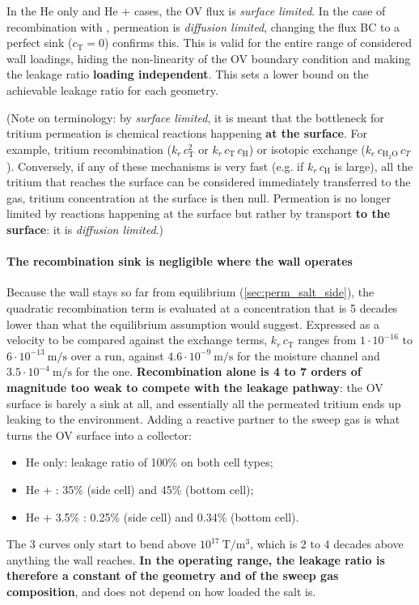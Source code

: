 \documentclass[a4paper,11pt,oneside]{report}
\newcounter{assumption}[chapter]
\begin{document}
In the He only and He +  cases, the OV flux is \textit{surface limited}. In the case of recombination with , permeation is \textit{diffusion limited}, changing the flux BC to a perfect sink ($c_\mathrm{T}=0$) confirms this. This is valid for the entire range of considered wall loadings, hiding the non-linearity of the OV boundary condition and making the leakage ratio \textbf{loading independent}. This sets a lower bound on the achievable leakage ratio for each geometry.

(Note on terminology: by \textit{surface limited}, it is meant that the bottleneck for tritium permeation is chemical reactions happening \textbf{at the surface}. For example, tritium recombination ($k_r\,c_\mathrm{T}^2$ or $k_r\,c_\mathrm{T}\,c_\mathrm{H}$) or isotopic exchange ($k_e\,c_\mathrm{H_2O}\,c_T$). Conversely, if any of these mechanisms is very fast (e.g. if $k_r\,c_\mathrm{H}$ is large), all the tritium that reaches the surface can be considered immediately transferred to the gas, tritium concentration at the surface is then null. Permeation is no longer limited by reactions happening at the surface but rather by transport \textbf{to the surface}: it is \textit{diffusion limited}.)

\paragraph{The recombination sink is negligible where the wall operates}
Because the wall stays so far from equilibrium (\cref{sec:perm_salt_side}), the quadratic recombination term is evaluated at a concentration that is 5 decades lower than what the equilibrium assumption would suggest. Expressed as a velocity to be compared against the exchange terms, $k_r\,c_\mathrm{T}$ ranges from $1\cdot10^{-16}$ to $6\cdot10^{-13}\ \mathrm{m/s}$ over a run, against $4.6\cdot10^{-9}\ \mathrm{m/s}$ for the moisture channel and $3.5\cdot10^{-4}\ \mathrm{m/s}$ for the  one. \textbf{Recombination alone is 4 to 7 orders of magnitude too weak to compete with the leakage pathway}: the OV surface is barely a sink at all, and essentially all the permeated tritium ends up leaking to the environment. Adding a reactive partner to the sweep gas is what turns the OV surface into a collector:
\begin{itemize}
    \item He only: leakage ratio of 100\% on both cell types;
    \item He + : 35\% (side cell) and 45\% (bottom cell);
    \item He + 3.5\% : 0.25\% (side cell) and 0.34\% (bottom cell).
\end{itemize}
The 3 curves only start to bend above $10^{17}\ \mathrm{T/m^3}$, which is 2 to 4 decades above anything the wall reaches. \textbf{In the operating range, the leakage ratio is therefore a constant of the geometry and of the sweep gas composition}, and does not depend on how loaded the salt is.
\end{document}
